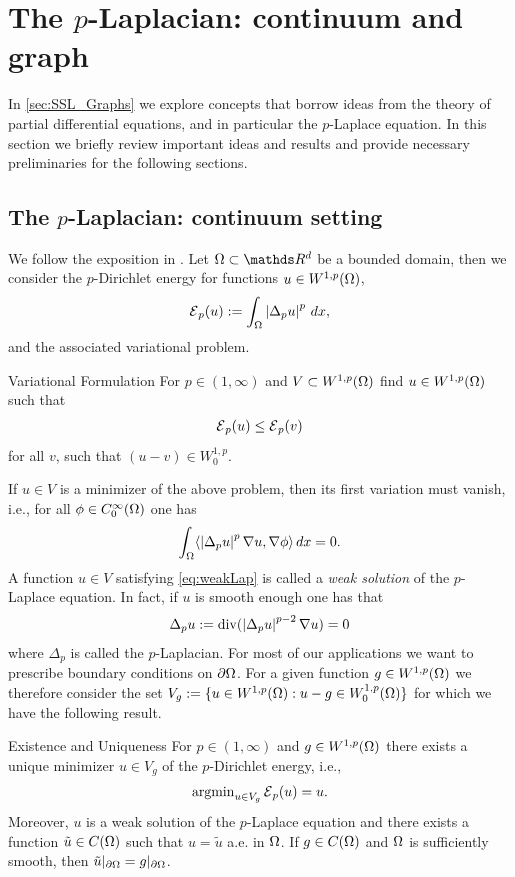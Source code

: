 \section{The $p$-Laplacian: continuum and graph}\label{sec:pLap}
%
In \cref{sec:SSL_Graphs} we explore concepts that borrow ideas from the theory of partial differential equations, and
in particular the $p$-Laplace equation. In this section we briefly review important ideas and results and provide 
necessary preliminaries for the following sections.
%
\subsection{The $p$-Laplacian: continuum setting}\label{sec:pLapcont}
We follow the exposition in \cite{lindqvist2017notes}. Let $\domain\subset\R^d$ be a bounded domain, then 
we consider the $p$-Dirichlet energy for functions $u\in W^{1,p}(\Omega)$,
%
\begin{align}\label{eq:DirichletEnergy}
\mathcal{E}{}_p(u) := \int_\Omega \left|\Delta_p u\right|^p \, dx,
\end{align}
%
and the associated variational problem.
%
\begin{problem}{Variational Formulation}{}
For $p\in (1,\infty)$ and $V\subset W^{1,p}(\Omega)$ find $u\in W^{1,p}(\Omega)$ such that
%
\begin{align*}
\mathcal{E}{}_p(u) \leq \mathcal{E}{}_p(v)
\end{align*}
%
for all $v$, such that $(u-v)\in W^{1,p}_0$.
\end{problem}
%
If $u\in V$ is a minimizer of the above problem, then its first variation must vanish, i.e., for all $\phi\in C^\infty_0(\Omega)$ one has
%
\begin{align}\label{eq:weakLap}
\int_\Omega \langle \left|\Delta_p u\right|^p \nabla u, \nabla \phi \rangle \, dx = 0.
\end{align}
%
A function $u\in V$ satisfying \cref{eq:weakLap} is called a \emph{weak solution} of the $p$-Laplace equation. In fact, if $u$ 
is smooth enough one has that
%
\begin{align}\label{eq:strongLap}
\Delta_p u := \operatorname{div}(\left|\Delta_p u\right|^{p-2} \nabla u) = 0
\end{align}
%
where $\Delta_p$ is called the $p$-Laplacian. For most of our applications we want to prescribe boundary conditions on $\partial \Omega$. 
For a given function $g\in W^{1,p}(\Omega)$ we therefore consider the set 
$V_g := \{u\in W^{1,p}(\Omega): u-g \in W^{1,p}_0(\Omega)\}$ for which we have the following result.
%
\begin{theorem}{Existence and Uniqueness}{}
For $p\in (1,\infty)$ and $g\in W^{1,p}(\Omega)$ there exists a unique minimizer $u\in V_g$ of the $p$-Dirichlet energy, i.e.,
%
\begin{align*}
\operatorname{argmin}_{u\in V_g} \mathcal{E}{}_p(u) = u.
\end{align*}
%
Moreover, $u$ is a weak solution of the $p$-Laplace equation and there exists a function $\tilde{u}\in C(\Omega)$ such that
$u = \tilde{u}$ a.e. in $\Omega$. If $g\in C(\Omega)$ and $\Omega$ is sufficiently smooth, then 
$\tilde{u}\vert_{\partial \Omega} = g\vert_{\partial \Omega}$.
\end{theorem}
